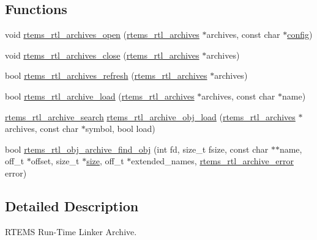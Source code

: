 \subsection*{Functions}
\begin{DoxyCompactItemize}
\item 
void \mbox{\hyperlink{rtl-archive_8h_af74d596594b488ff923e027e9b895d1f}{rtems\+\_\+rtl\+\_\+archives\+\_\+open}} (\mbox{\hyperlink{structrtems__rtl__archives}{rtems\+\_\+rtl\+\_\+archives}} $\ast$archives, const char $\ast$\mbox{\hyperlink{structconfig__s}{config}})
\item 
void \mbox{\hyperlink{rtl-archive_8h_a0c1d8b43e832e9f6c9dd0d583b952384}{rtems\+\_\+rtl\+\_\+archives\+\_\+close}} (\mbox{\hyperlink{structrtems__rtl__archives}{rtems\+\_\+rtl\+\_\+archives}} $\ast$archives)
\item 
bool \mbox{\hyperlink{rtl-archive_8h_ad357ba19c50eb2c554a8ef8bbd1baa74}{rtems\+\_\+rtl\+\_\+archives\+\_\+refresh}} (\mbox{\hyperlink{structrtems__rtl__archives}{rtems\+\_\+rtl\+\_\+archives}} $\ast$archives)
\item 
bool \mbox{\hyperlink{rtl-archive_8h_aec513bfd77432b5004d1a4ed91b7bc3d}{rtems\+\_\+rtl\+\_\+archive\+\_\+load}} (\mbox{\hyperlink{structrtems__rtl__archives}{rtems\+\_\+rtl\+\_\+archives}} $\ast$archives, const char $\ast$name)
\item 
\mbox{\hyperlink{rtl-archive_8h_a82930c14e64f3f5853052e84af4a6c2e}{rtems\+\_\+rtl\+\_\+archive\+\_\+search}} \mbox{\hyperlink{rtl-archive_8h_a48e3be1af298eca62a62e5f1bc72c916}{rtems\+\_\+rtl\+\_\+archive\+\_\+obj\+\_\+load}} (\mbox{\hyperlink{structrtems__rtl__archives}{rtems\+\_\+rtl\+\_\+archives}} $\ast$archives, const char $\ast$symbol, bool load)
\item 
bool \mbox{\hyperlink{rtl-archive_8h_a3f842a164d6f4aeb32c4ccde6177a530}{rtems\+\_\+rtl\+\_\+obj\+\_\+archive\+\_\+find\+\_\+obj}} (int fd, size\+\_\+t fsize, const char $\ast$$\ast$name, off\+\_\+t $\ast$offset, size\+\_\+t $\ast$\mbox{\hyperlink{sun4u_2tte_8h_a245260f6f74972558f61b85227df5aae}{size}}, off\+\_\+t $\ast$extended\+\_\+names, \mbox{\hyperlink{rtl-archive_8h_aeb92821ca23c9daa5393579aa7b9212f}{rtems\+\_\+rtl\+\_\+archive\+\_\+error}} error)
\end{DoxyCompactItemize}


\subsection{Detailed Description}
R\+T\+E\+MS Run-\/\+Time Linker Archive. 

